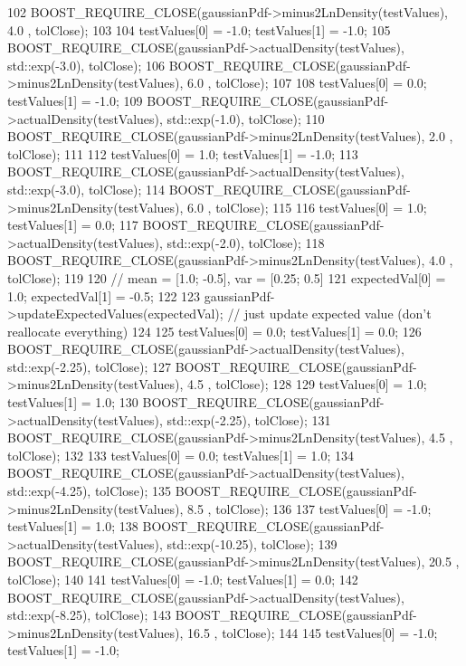 \begin{DoxyCode}
102   BOOST\_REQUIRE\_CLOSE(gaussianPdf->minus2LnDensity(testValues),         4.0 , tolClose);
103 
104   testValues[0] = -1.0; testValues[1] = -1.0;
105   BOOST\_REQUIRE\_CLOSE(gaussianPdf->actualDensity(testValues), std::exp(-3.0), tolClose);
106   BOOST\_REQUIRE\_CLOSE(gaussianPdf->minus2LnDensity(testValues),         6.0 , tolClose);
107 
108   testValues[0] = 0.0; testValues[1] = -1.0;
109   BOOST\_REQUIRE\_CLOSE(gaussianPdf->actualDensity(testValues), std::exp(-1.0), tolClose);
110   BOOST\_REQUIRE\_CLOSE(gaussianPdf->minus2LnDensity(testValues),         2.0 , tolClose);
111 
112   testValues[0] = 1.0; testValues[1] = -1.0;
113   BOOST\_REQUIRE\_CLOSE(gaussianPdf->actualDensity(testValues), std::exp(-3.0), tolClose);
114   BOOST\_REQUIRE\_CLOSE(gaussianPdf->minus2LnDensity(testValues),         6.0 , tolClose);
115 
116   testValues[0] = 1.0; testValues[1] = 0.0;
117   BOOST\_REQUIRE\_CLOSE(gaussianPdf->actualDensity(testValues), std::exp(-2.0), tolClose);
118   BOOST\_REQUIRE\_CLOSE(gaussianPdf->minus2LnDensity(testValues),         4.0 , tolClose);
119 
120   \textcolor{comment}{// mean = [1.0; -0.5], var = [0.25; 0.5]}
121   expectedVal[0] = 1.0; expectedVal[1] = -0.5;
122 
123   gaussianPdf->updateExpectedValues(expectedVal); \textcolor{comment}{// just update expected value (don't reallocate
       everything)}
124 
125   testValues[0] = 0.0; testValues[1] = 0.0;
126   BOOST\_REQUIRE\_CLOSE(gaussianPdf->actualDensity(testValues), std::exp(-2.25), tolClose);
127   BOOST\_REQUIRE\_CLOSE(gaussianPdf->minus2LnDensity(testValues),         4.5  , tolClose); 
128 
129   testValues[0] = 1.0; testValues[1] = 1.0;
130   BOOST\_REQUIRE\_CLOSE(gaussianPdf->actualDensity(testValues), std::exp(-2.25), tolClose);
131   BOOST\_REQUIRE\_CLOSE(gaussianPdf->minus2LnDensity(testValues),         4.5 , tolClose);
132 
133   testValues[0] = 0.0; testValues[1] = 1.0;
134   BOOST\_REQUIRE\_CLOSE(gaussianPdf->actualDensity(testValues), std::exp(-4.25), tolClose);
135   BOOST\_REQUIRE\_CLOSE(gaussianPdf->minus2LnDensity(testValues),         8.5  , tolClose);
136 
137   testValues[0] = -1.0; testValues[1] = 1.0;
138   BOOST\_REQUIRE\_CLOSE(gaussianPdf->actualDensity(testValues), std::exp(-10.25), tolClose);
139   BOOST\_REQUIRE\_CLOSE(gaussianPdf->minus2LnDensity(testValues),         20.5  , tolClose);
140 
141   testValues[0] = -1.0; testValues[1] = 0.0;
142   BOOST\_REQUIRE\_CLOSE(gaussianPdf->actualDensity(testValues), std::exp(-8.25), tolClose);
143   BOOST\_REQUIRE\_CLOSE(gaussianPdf->minus2LnDensity(testValues),        16.5  , tolClose);
144 
145   testValues[0] = -1.0; testValues[1] = -1.0;

\end{DoxyCode}

